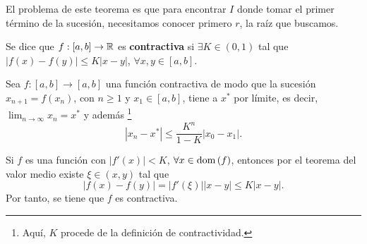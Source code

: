 \begin{observation}
\normalfont El problema de este teorema es que para encontrar $\displaystyle I $ donde tomar el primer término de la sucesión, necesitamos conocer primero $\displaystyle r $, la raíz que buscamos.
\end{observation}
\begin{fdefinition}
	\normalfont Se dice que $\displaystyle f : \left[a,b\right] \to \mathbb{R} $ es \textbf{contractiva} si $\displaystyle \exists K \in \left(0,1\right) $ tal que $\displaystyle \left|f\left(x\right)-f\left(y\right)\right| \leq K \left|x-y\right| $, $\displaystyle \forall x,y \in \left[a,b\right]  $.
\end{fdefinition}
\begin{flema}
	\normalfont Sea $\displaystyle f : \left[a,b\right] \to \left[a,b\right]  $ una función contractiva de modo que la sucesión $\displaystyle x_{n+1} = f\left(x_{n}\right) $, con $\displaystyle n \geq 1 $ y $\displaystyle x_{1} \in \left[a,b\right]  $, tiene a $\displaystyle x^{*} $ por límite, es decir, $\displaystyle \lim_{n \to \infty}x_{n} = x^{*} $ y además \footnote{Aquí, $\displaystyle K $ procede de la definición de contractividad.} 
	\[ \left|x_{n}-x^{*}\right| \leq \frac{K^{n}}{1-K} \left|x_{0}-x_{1}\right| .\]
\end{flema}
\begin{observation}
\normalfont Si $\displaystyle f $ es una función con $\displaystyle \left|f'\left(x\right)\right|< K $, $\displaystyle \forall x \in \operatorname{dom}\left(f\right) $, entonces por el teorema del valor medio existe $\displaystyle \xi \in \left(x,y\right) $ tal que 
\[ \left|f\left(x\right)-f\left(y\right)\right| = \left|f'\left(\xi\right)\right| \left|x-y\right| \leq K \left|x-y\right| .\]
Por tanto, se tiene que $\displaystyle f $ es contractiva.
\end{observation}
